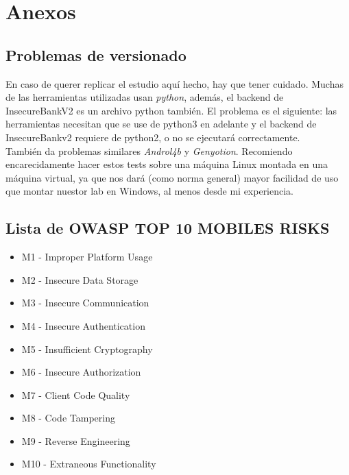 \documentclass[12pt,twoside]{article}
\begin{document}
\newpage
\section{Anexos}
\subsection{Problemas de versionado}
En caso de querer replicar el estudio aquí hecho, hay que tener cuidado. Muchas de las herramientas utilizadas usan \textit{python}, además, el backend de InsecureBankV2 es un archivo python también. El problema es el siguiente: las herramientas necesitan que se use de python3 en adelante y el backend de InsecureBankv2 requiere de python2, o no se ejecutará correctamente.\\
También da problemas similares \textit{Androl4b} y \textit{Genyotion}. Recomiendo encarecidamente hacer estos tests sobre una máquina Linux montada en una máquina virtual, ya que nos dará (como norma general) mayor facilidad de uso que montar nuestor lab en Windows, al menos desde mi experiencia. 
\subsection{Lista de OWASP TOP 10 MOBILES RISKS}
\begin{itemize}
    \item M1 - Improper Platform Usage
    \item M2 - Insecure Data Storage
    \item M3 - Insecure Communication
    \item M4 - Insecure Authentication
    \item M5 - Insufficient Cryptography
    \item M6 - Insecure Authorization
    \item M7 - Client Code Quality
    \item M8 - Code Tampering
    \item M9 - Reverse Engineering
    \item M10 - Extraneous Functionality
\end{itemize}
\end{document}

